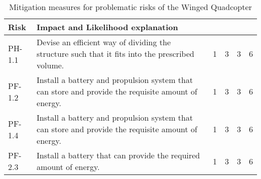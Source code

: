 \begin{table}
    \centering
    \caption{Mitigation measures for problematic risks of the Winged Quadcopter}
    \label{tab:miti_wing_quad}
    \begin{tabularx}{\textwidth}{l L *{4}{c} }
    \toprule
    Risk            & Impact and Likelihood explanation
    \\ \midrule
    PH-1.1          & Devise an efficient way of dividing the structure such that it fits into the prescribed volume.     & 1 & 3 & 3 & 6
    \\ \hdashline
    PF-1.2          & Install a battery and propulsion system that can store and provide the requisite amount of energy.              & 1 & 3 & 3 & 6
    \\ \hdashline
    PF-1.4          & Install a battery and propulsion system that can store and provide the requisite amount of energy.              & 1 & 3 & 3 & 6
    \\ \hdashline
    PF-2.3          & Install a battery that can provide the required amount of energy.              & 1 & 3 & 3 & 6
    \\ \bottomrule
    \end{tabularx}
\end{table}

\fi

